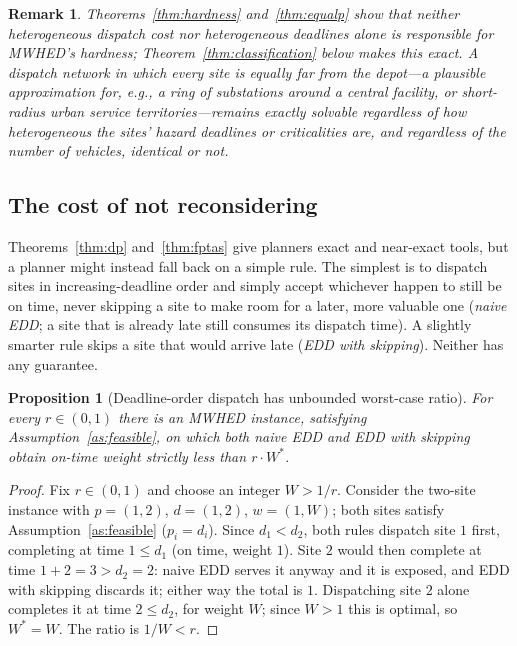 \documentclass[pdflatex,sn-mathphys-ay]{sn-jnl}
\theoremstyle{thmstyleone}
\newtheorem{proposition}[theorem]{Proposition}
\theoremstyle{thmstyletwo}
\newtheorem{remark}{Remark}
\theoremstyle{thmstylethree}
\begin{document}
\begin{remark}\label{rem:hardness-boundary}
Theorems~\ref{thm:hardness} and~\ref{thm:equalp} show that neither
heterogeneous dispatch cost nor heterogeneous deadlines alone is
responsible for MWHED's hardness; Theorem~\ref{thm:classification}
below makes this exact. A dispatch network in which every site is
equally far from the depot---a plausible approximation for, e.g., a
ring of substations around a central facility, or short-radius urban
service territories---remains exactly solvable regardless of how
heterogeneous the sites' hazard deadlines or criticalities are, and
regardless of the number of vehicles, identical or not.
\end{remark}

\subsection{The cost of not reconsidering}

Theorems~\ref{thm:dp} and~\ref{thm:fptas} give planners exact and
near-exact tools, but a planner might instead fall back on a simple
rule. The simplest is to dispatch sites in increasing-deadline order and
simply accept whichever happen to still be on time, never skipping a
site to make room for a later, more valuable one (\emph{naive EDD}; a
site that is already late still consumes its dispatch time). A slightly
smarter rule skips a site that would arrive late (\emph{EDD with
skipping}). Neither has any guarantee.

\begin{proposition}[Deadline-order dispatch has unbounded worst-case ratio]\label{prop:naive}
For every $r \in (0,1)$ there is an MWHED instance, satisfying
Assumption~\ref{as:feasible}, on which both naive EDD and EDD with
skipping obtain on-time weight strictly less than $r \cdot W^\ast$.
\end{proposition}

\begin{proof}
Fix $r \in (0,1)$ and choose an integer $W > 1/r$. Consider the
two-site instance with $p = (1, 2)$, $d = (1, 2)$, $w = (1, W)$; both
sites satisfy Assumption~\ref{as:feasible} ($p_i = d_i$). Since
$d_1 < d_2$, both rules dispatch site $1$ first, completing at time
$1 \le d_1$ (on time, weight $1$). Site $2$ would then complete at time
$1+2=3 > d_2=2$: naive EDD serves it anyway and it is exposed, and EDD
with skipping discards it; either way the total is $1$. Dispatching site
$2$ alone completes it at time $2 \le d_2$, for weight $W$; since $W>1$
this is optimal, so $W^\ast = W$. The ratio is $1/W < r$.
\end{proof}
\end{document}
